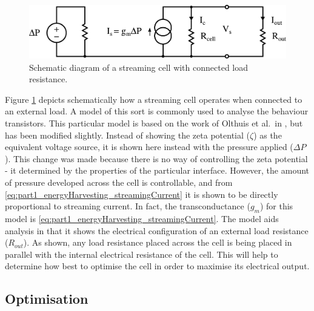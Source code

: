     \begin{figure}
        \centering
            \includegraphics[width=\textwidth]{content/pt1/01-PowerHarvesting/graphics/StreamingCell_EquivalentCircuit_output}
        \caption{\label{fig:StreamingCell_Schematic-representation}Schematic diagram of a streaming cell with connected load resistance.}
    \end{figure}
    Figure \ref{fig:StreamingCell_Schematic-representation} depicts schematically how a streaming cell operates when connected to an external load.
    A model of this sort is commonly used to analyse the behaviour transistors.
    This particular model is based on the work of Olthuis et al.\ in \cite{Olthuis2005}, but has been modified slightly.
    Instead of showing the zeta potential ($\zeta$) as the equivalent voltage source, it is shown here instead with the pressure applied ($\Delta P$).
    This change was made because there is no way of controlling the zeta potential - it determined by the properties of the particular interface.
    However, the amount of pressure developed across the cell is controllable, and from \cref{eq:part1_energyHarvesting_streamingCurrent} it is shown to be directly proportional to streaming current.
    In fact, the transconductance ($g_{m}$) for this model is \cref{eq:part1_energyHarvesting_streamingCurrent}.
    The model aids analysis in that it shows the electrical configuration of an external load resistance ($R_{out}$).
    As shown, any load resistance placed across the cell is being placed in parallel with the internal electrical resistance of the cell.
    This will help to determine how best to optimise the cell in order to maximise its electrical output.


  \subsection{Optimisation}

